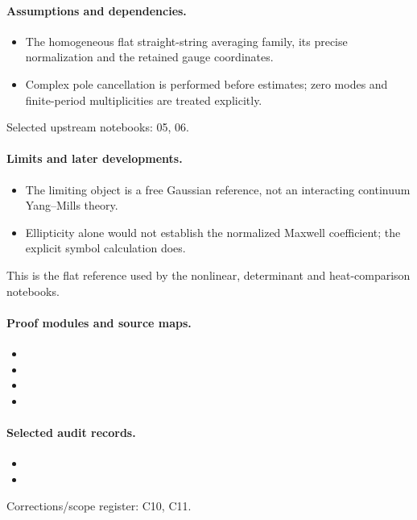 \documentclass[11pt]{article}
\theoremstyle{remark}
\begin{document}
\paragraph{Assumptions and dependencies.}
\begin{itemize}
\item The homogeneous flat straight-string averaging family, its precise normalization and the retained gauge coordinates.
\item Complex pole cancellation is performed before estimates; zero modes and finite-period multiplicities are treated explicitly.
\end{itemize}

Selected upstream notebooks: 05, 06.\par

\paragraph{Limits and later developments.}
\begin{itemize}
\item The limiting object is a free Gaussian reference, not an interacting continuum Yang--Mills theory.
\item Ellipticity alone would not establish the normalized Maxwell coefficient; the explicit symbol calculation does.
\end{itemize}

This is the flat reference used by the nonlinear, determinant and heat-comparison notebooks.

\paragraph{Proof modules and source maps.}
\begingroup\small
\begin{itemize}
\item {}
\item {}
\item {}
\item {}
\end{itemize}
\endgroup

\paragraph{Selected audit records.}
\begingroup\small
\begin{itemize}
\item {}
\item {}
\end{itemize}
\endgroup
Corrections/scope register: C10, C11.\par
\end{document}
